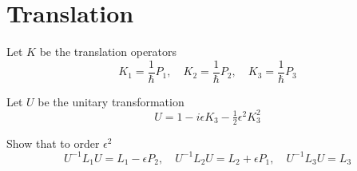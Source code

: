 

\section*{Translation}

Let $K$ be the translation operators
\begin{equation*}
K_1=\frac{1}{\hbar}P_1,\quad K_2=\frac{1}{\hbar}P_2,\quad K_3=\frac{1}{\hbar}P_3
\end{equation*}

Let $U$ be the unitary transformation
\begin{equation*}
U=1-i\epsilon K_3-\tfrac{1}{2}\epsilon^2K_3^2
\end{equation*}

Show that to order $\epsilon^2$
\begin{equation*}
U^{-1}L_1U=L_1-\epsilon P_2,\quad
U^{-1}L_2U=L_2+\epsilon P_1,\quad
U^{-1}L_3U=L_3
\end{equation*}



